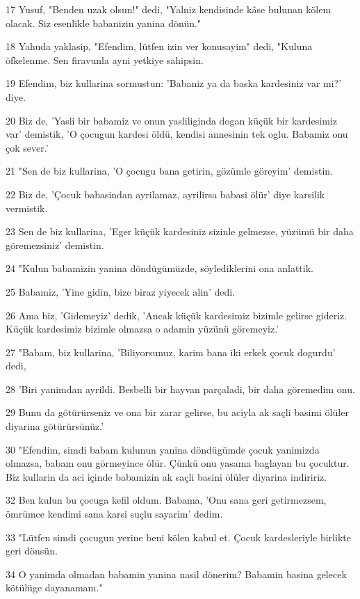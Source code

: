 \par 17 Yusuf, "Benden uzak olsun!" dedi, "Yalniz kendisinde kâse bulunan kölem olacak. Siz esenlikle babanizin yanina dönün."
\par 18 Yahuda yaklasip, "Efendim, lütfen izin ver konusayim" dedi, "Kuluna öfkelenme. Sen firavunla ayni yetkiye sahipsin.
\par 19 Efendim, biz kullarina sormustun: 'Babaniz ya da baska kardesiniz var mi?' diye.
\par 20 Biz de, 'Yasli bir babamiz ve onun yasliliginda dogan küçük bir kardesimiz var' demistik, 'O çocugun kardesi öldü, kendisi annesinin tek oglu. Babamiz onu çok sever.'
\par 21 "Sen de biz kullarina, 'O çocugu bana getirin, gözümle göreyim' demistin.
\par 22 Biz de, 'Çocuk babasindan ayrilamaz, ayrilirsa babasi ölür' diye karsilik vermistik.
\par 23 Sen de biz kullarina, 'Eger küçük kardesiniz sizinle gelmezse, yüzümü bir daha göremezsiniz' demistin.
\par 24 "Kulun babamizin yanina döndügümüzde, söylediklerini ona anlattik.
\par 25 Babamiz, 'Yine gidin, bize biraz yiyecek alin' dedi.
\par 26 Ama biz, 'Gidemeyiz' dedik, 'Ancak küçük kardesimiz bizimle gelirse gideriz. Küçük kardesimiz bizimle olmazsa o adamin yüzünü göremeyiz.'
\par 27 "Babam, biz kullarina, 'Biliyorsunuz, karim bana iki erkek çocuk dogurdu' dedi,
\par 28 'Biri yanimdan ayrildi. Besbelli bir hayvan parçaladi, bir daha göremedim onu.
\par 29 Bunu da götürürseniz ve ona bir zarar gelirse, bu aciyla ak saçli basimi ölüler diyarina götürürsünüz.'
\par 30 "Efendim, simdi babam kulunun yanina döndügümde çocuk yanimizda olmazsa, babam onu görmeyince ölür. Çünkü onu yasama baglayan bu çocuktur. Biz kullarin da aci içinde babamizin ak saçli basini ölüler diyarina indiririz.
\par 32 Ben kulun bu çocuga kefil oldum. Babama, 'Onu sana geri getirmezsem, ömrümce kendimi sana karsi suçlu sayarim' dedim.
\par 33 "Lütfen simdi çocugun yerine beni kölen kabul et. Çocuk kardesleriyle birlikte geri dönsün.
\par 34 O yanimda olmadan babamin yanina nasil dönerim? Babamin basina gelecek kötülüge dayanamam."

